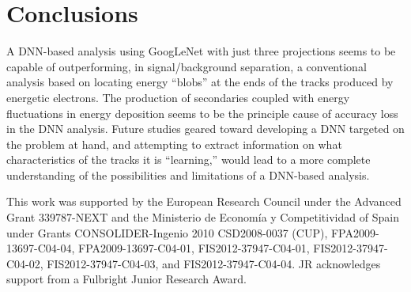\documentclass[a4paper,11pt]{article}
\begin{document}
\section{Conclusions}
A DNN-based analysis using GoogLeNet with just three projections seems to be capable of outperforming, in signal/background separation, a conventional analysis based on locating energy ``blobs'' at the ends of the tracks produced by energetic electrons.  The production of secondaries coupled with energy fluctuations in energy deposition seems to be the principle cause of accuracy loss in the DNN analysis.  Future studies geared toward developing a DNN targeted on the problem at hand, and attempting to extract information on what characteristics of the tracks it is ``learning,'' would lead to a more complete understanding of the possibilities and limitations of a DNN-based analysis.

\acknowledgments

This work was supported by the European Research Council under the Advanced Grant 339787-NEXT and the Ministerio de Econom\'{i}a y Competitividad of Spain under Grants CONSOLIDER-Ingenio 2010 CSD2008-0037 (CUP), FPA2009-13697-C04-04, FPA2009-13697-C04-01, FIS2012-37947-C04-01, FIS2012-37947-C04-02, FIS2012-37947-C04-03, and FIS2012-37947-C04-04.  JR acknowledges support from a Fulbright Junior Research Award.


\end{document}
